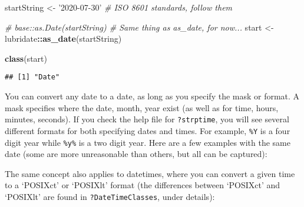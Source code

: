 \documentclass[
]{book}
\newenvironment{Shaded}{\begin{snugshade}}{\end{snugshade}}
\newcommand{\CommentTok}[1]{\textcolor[rgb]{0.56,0.35,0.01}{\textit{#1}}}
\newcommand{\DataTypeTok}[1]{\textcolor[rgb]{0.13,0.29,0.53}{#1}}
\newcommand{\KeywordTok}[1]{\textcolor[rgb]{0.13,0.29,0.53}{\textbf{#1}}}
\newcommand{\NormalTok}[1]{#1}
\newcommand{\OperatorTok}[1]{\textcolor[rgb]{0.81,0.36,0.00}{\textbf{#1}}}
\newcommand{\StringTok}[1]{\textcolor[rgb]{0.31,0.60,0.02}{#1}}
\begin{document}
\begin{Shaded}
\begin{Highlighting}[]
\NormalTok{startString <-}\StringTok{ '2020-07-30'} \CommentTok{# ISO 8601 standards, follow them}

\CommentTok{# base::as.Date(startString) # Same thing as as_date, for now...}
\NormalTok{start <-}\StringTok{ }\NormalTok{lubridate}\OperatorTok{::}\KeywordTok{as_date}\NormalTok{(startString)}

\KeywordTok{class}\NormalTok{(start)}
\end{Highlighting}
\end{Shaded}

\begin{verbatim}
## [1] "Date"
\end{verbatim}

You can convert any date to a date, as long as you specify the mask or format. A mask specifies where the date, month, year exist (as well as for time, hours, minutes, seconds). If you check the help file for \texttt{?strptime}, you will see several different formats for both specifying dates and times. For example, \texttt{\%Y} is a four digit year while \texttt{\%y\%} is a two digit year. Here are a few examples with the same date (some are more unreasonable than others, but all can be captured):

\begin{Shaded}
\end{Shaded}

The same concept also applies to datetimes, where you can convert a given time to a `POSIXct' or `POSIXlt' format (the differences between `POSIXct' and `POSIXlt' are found in \texttt{?DateTimeClasses}, under details):
\end{document}
